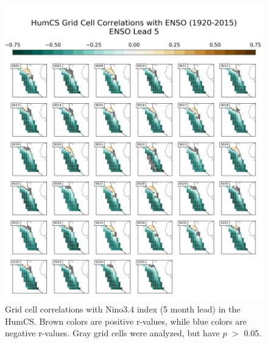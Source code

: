 \documentclass[12pt]{article}
\begin{document}
\begin{figure}[!h]
	\centering
	\includegraphics[width=\linewidth]{../../figs/humcs/spatial-correlations/humcs-grid-cell-correlations-nino34-postage-lag5.png}
	\caption{Grid cell correlations with Nino3.4 index (5 month lead) in the HumCS. Brown colors are positive r-values, while blue colors are negative r-values. Gray grid cells were analyzed, but have $p$ $>$ 0.05.}
	\label{fig:HumCS-ENSO5-Spatial}
\end{figure}
\newpage
\end{document}
